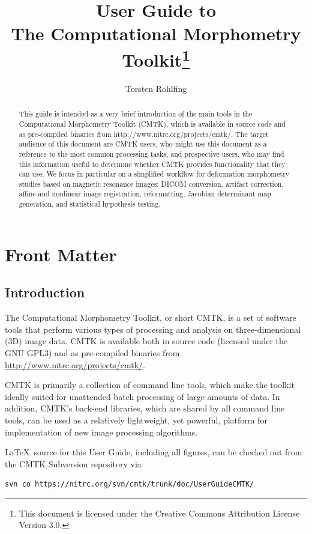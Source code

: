 \documentclass{InsightArticle}
\title{User Guide to \\[4mm] The Computational Morphometry
  Toolkit\footnote{This document is licensed under
    the Creative Commons Attribution License Version 3.0.}}
\author{Torsten Rohlfing}
\begin{document}
\maketitle

\ifhtml
\chapter*{Front Matter\label{front}}
\fi


\begin{abstract}
\noindent This guide is intended as a very brief introduction of the main
tools in the Computational Morphometry Toolkit (CMTK), which is available in
source code and as pre-compiled binaries from
http://www.nitrc.org/projects/cmtk/. The target audience of this document are
CMTK users, who might use this document as a reference to the most common
processing tasks, and prospective users, who may find this information useful
to determine whether CMTK provides functionality that they can use. We focus
in particular on a simplified workflow for deformation morphometry studies
based on magnetic resonance images: DICOM conversion, artifact correction,
affine and nonlinear image registration, reformatting, Jacobian determinant
map generation, and statistical hypothesis testing.
\end{abstract}

\clearpage
\tableofcontents

\clearpage
\section{Introduction}

The Computational Morphometry Toolkit, or short CMTK, is a set of software
tools that perform various types of processing and analysis on
three-dimensional (3D) image data. CMTK is available both in source code
(licensed under the GNU GPL3) and as pre-compiled binaries from
\url{http://www.nitrc.org/projects/cmtk/}.

CMTK is primarily a collection of command line tools, which make the toolkit
ideally suited for unattended batch processing of large amounts of data. In
addition, CMTK's back-end libraries, which are shared by all command line
tools, can be used as a relatively lightweight, yet powerful, platform for
implementation of new image processing algorithms.

\LaTeX\ source for this User Guide, including all figures, can be checked out
from the CMTK Subversion repository via
\begin{verbatim}
svn co https://nitrc.org/svn/cmtk/trunk/doc/UserGuideCMTK/
\end{verbatim}
\end{document}

